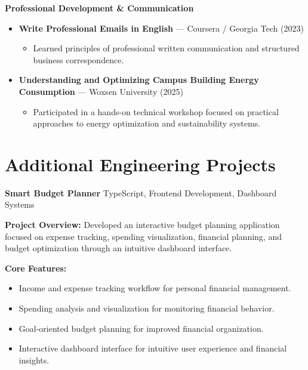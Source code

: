 \documentclass[a4paper,11pt]{article}
\newcommand{\resumeProject}[2]{
\textbf{#1} \hfill {\small #2}
}
\begin{document}
\textbf{Professional Development \& Communication}
\begin{itemize}

    \item \textbf{Write Professional Emails in English} --- Coursera / Georgia Tech (2023)

    \begin{itemize}
        \item Learned principles of professional written communication and structured business correspondence.
    \end{itemize}

    \item \textbf{Understanding and Optimizing Campus Building Energy Consumption} --- Woxsen University (2025)

    \begin{itemize}
        \item Participated in a hands-on technical workshop focused on practical approaches to energy optimization and sustainability systems.
    \end{itemize}

\end{itemize}










\section{Additional Engineering Projects}

\resumeProject
{Smart Budget Planner}
{TypeScript, Frontend Development, Dashboard Systems}

\textbf{Project Overview:}
Developed an interactive budget planning application focused on expense tracking, spending visualization, financial planning, and budget optimization through an intuitive dashboard interface.

\textbf{Core Features:}
\begin{itemize}
    \item Income and expense tracking workflow for personal financial management.
    
    \item Spending analysis and visualization for monitoring financial behavior.
    
    \item Goal-oriented budget planning for improved financial organization.
    
    \item Interactive dashboard interface for intuitive user experience and financial insights.
\end{itemize}
\end{document}
